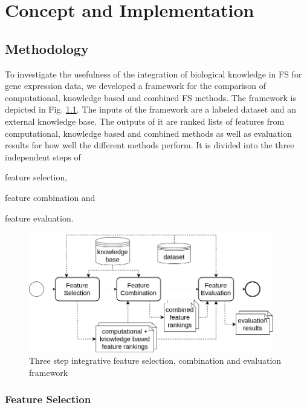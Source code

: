 \chapter{Concept and Implementation}
\label{chapter:conceptApproachSolution}

\section{Methodology}

To investigate the usefulness of the integration of biological knowledge in FS for gene expression data, we developed a framework for the comparison of computational, knowledge based and combined FS methods. 
The framework is depicted in Fig. \ref{fig:framework}.
The inputs of the framework are a labeled dataset and an external knowledge base.
The outputs of it are ranked lists of features from computational, knowledge based and combined methods as well as evaluation results for how well the different methods perform.
It is divided into the three independent steps of
\begin{enumerate*}[label={\alph*)},font={\bfseries}]
    \item feature selection,
    \item feature combination and
    \item feature evaluation.
\end{enumerate*}

\begin{figure}[h!]
\setlength{\belowcaptionskip}{-15pt}
\centering
\includegraphics[width=0.95\textwidth]{figures/architecture2.png}
\caption{Three step integrative feature selection, combination and evaluation framework}
\label{fig:framework}
\end{figure}

\subsection{Feature Selection} 

